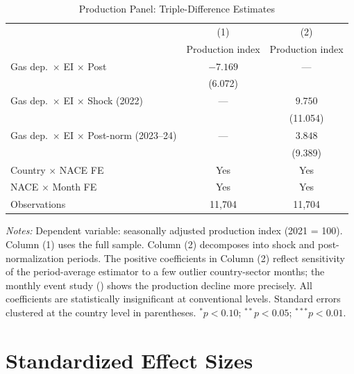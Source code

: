 \documentclass[12pt]{article}
\begin{document}
\begin{table}[H]
\centering
\caption{Production Panel: Triple-Difference Estimates}
\label{tab:prod_did}
\begin{threeparttable}
\begin{tabular}{lcc}
\toprule
 & (1) & (2) \\
 & Production index & Production index \\
\midrule
Gas dep.\ $\times$ EI $\times$ Post & $-7.169$ & --- \\
 & (6.072) & \\
Gas dep.\ $\times$ EI $\times$ Shock (2022) & --- & $9.750$ \\
 & & (11.054) \\
Gas dep.\ $\times$ EI $\times$ Post-norm (2023--24) & --- & $3.848$ \\
 & & (9.389) \\
\addlinespace
Country $\times$ NACE FE & Yes & Yes \\
NACE $\times$ Month FE & Yes & Yes \\
Observations & 11,704 & 11,704 \\
\bottomrule
\end{tabular}
\begin{tablenotes}[flushleft]
\small
\item \textit{Notes:} Dependent variable: seasonally adjusted production index (2021 = 100). Column (1) uses the full sample. Column (2) decomposes into shock and post-normalization periods. The positive coefficients in Column (2) reflect sensitivity of the period-average estimator to a few outlier country-sector months; the monthly event study () shows the production decline more precisely. All coefficients are statistically insignificant at conventional levels. Standard errors clustered at the country level in parentheses. $^{*}p<0.10$; $^{**}p<0.05$; $^{***}p<0.01$.
\end{tablenotes}
\end{threeparttable}
\end{table}


\section{Standardized Effect Sizes}
\label{sec:sde}
\end{document}
